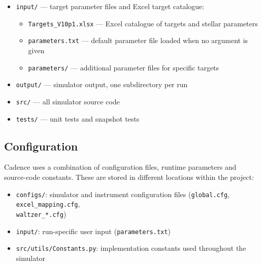 \begin{itemize}
\begin{itemize}
              \item \texttt{stellar\_param\_mamjeck.txt} — Mamajek star parameter table for spectral type assignment
              \item \texttt{models/} — stellar atmosphere model grids
              \item \texttt{BackgroundStars/} — cached Gaia background star catalogues per target
          \end{itemize}
    \item \texttt{input/} — target parameter files and Excel target catalogue:
          \begin{itemize}
              \item \texttt{Targets\_V10p1.xlsx} — Excel catalogue of targets and stellar parameters
              \item \texttt{parameters.txt} — default parameter file loaded when no argument is given
              \item \texttt{parameters/} — additional parameter files for specific targets
          \end{itemize}
    \item \texttt{output/} — simulator output, one subdirectory per run
    \item \texttt{src/} — all simulator source code
    \item \texttt{tests/} — unit tests and snapshot tests
\end{itemize}

\subsection{Configuration}

Cadence uses a combination of configuration files, runtime parameters and source-code constants. These are stored in different locations within the project:

\begin{itemize}

    \item \texttt{configs/}: simulator and instrument configuration files (\texttt{global.cfg}, \texttt{excel\_mapping.cfg}, \\
          \texttt{waltzer\_*.cfg})

    \item \texttt{input/}: run-specific user input (\texttt{parameters.txt})

    \item \texttt{src/utils/Constants.py}: implementation constants used throughout the simulator

\end{itemize}

